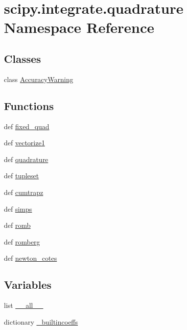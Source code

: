 \hypertarget{namespacescipy_1_1integrate_1_1quadrature}{}\section{scipy.\+integrate.\+quadrature Namespace Reference}
\label{namespacescipy_1_1integrate_1_1quadrature}
\subsection*{Classes}
\begin{DoxyCompactItemize}
\item 
class \hyperlink{classscipy_1_1integrate_1_1quadrature_1_1AccuracyWarning}{Accuracy\+Warning}
\end{DoxyCompactItemize}
\subsection*{Functions}
\begin{DoxyCompactItemize}
\item 
def \hyperlink{namespacescipy_1_1integrate_1_1quadrature_ad476b679d3cda6172eea04808c96c09b}{fixed\+\_\+quad}
\item 
def \hyperlink{namespacescipy_1_1integrate_1_1quadrature_a1c8e29a28905d6d6dc37b2bef03924dc}{vectorize1}
\item 
def \hyperlink{namespacescipy_1_1integrate_1_1quadrature_a17ecd5aa1aabce0b1fc8711d0c9e2d30}{quadrature}
\item 
def \hyperlink{namespacescipy_1_1integrate_1_1quadrature_ae6fc0f8297f0fe9cdc652b49ed82e99e}{tupleset}
\item 
def \hyperlink{namespacescipy_1_1integrate_1_1quadrature_a0f790103dbfa4225a3461937d276d702}{cumtrapz}
\item 
def \hyperlink{namespacescipy_1_1integrate_1_1quadrature_a49ca3dfd374e9956fe74ea63deba119d}{simps}
\item 
def \hyperlink{namespacescipy_1_1integrate_1_1quadrature_a0ae37646c0298954d73176f7789f68ad}{romb}
\item 
def \hyperlink{namespacescipy_1_1integrate_1_1quadrature_ae4b09bd822e22fc007e8beeed12d453e}{romberg}
\item 
def \hyperlink{namespacescipy_1_1integrate_1_1quadrature_ac31c8e7b87322bf22f1f7633ed1286d3}{newton\+\_\+cotes}
\end{DoxyCompactItemize}
\subsection*{Variables}
\begin{DoxyCompactItemize}
\item 
list \hyperlink{namespacescipy_1_1integrate_1_1quadrature_a702cfc5034a5d8f4a7c1d962c6d7aab7}{\+\_\+\+\_\+all\+\_\+\+\_\+}
\item 
dictionary \hyperlink{namespacescipy_1_1integrate_1_1quadrature_a56fc32638c1b1719993c6bc675708ad2}{\+\_\+builtincoeffs}
\end{DoxyCompactItemize}


